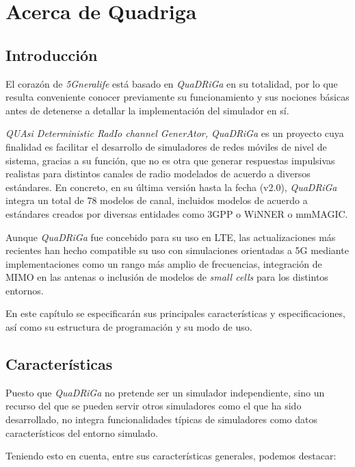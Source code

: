 \chapter{Acerca de Quadriga}\label{cap.quadriga}
\section{Introducción}
El corazón de \textit{5Gneralife} está basado en \textit{QuaDRiGa} en su totalidad, por lo que resulta conveniente conocer previamente su funcionamiento y sus nociones básicas antes de detenerse a detallar la implementación del simulador en sí.

\textit{QUAsi Deterministic RadIo channel GenerAtor, QuaDRiGa} es un proyecto cuya finalidad es facilitar el desarrollo de simuladores de redes móviles de nivel de sistema, gracias a su función, que no es otra que generar respuestas impulsivas realistas para distintos canales de radio modelados de acuerdo a diversos estándares. En concreto, en su última versión hasta la fecha (v2.0), \textit{QuaDRiGa} integra un total de 78 modelos de canal, incluidos modelos de acuerdo a estándares creados por diversas entidades como 3GPP o WiNNER \cite{winner} o mmMAGIC.

Aunque \textit{QuaDRiGa} fue concebido para su uso en LTE, las actualizaciones más recientes han hecho compatible su uso con simulaciones orientadas a 5G mediante implementaciones como un rango más amplio de frecuencias, integración de MIMO en las antenas o inclusión de modelos de \textit{small cells} para los distintos entornos.

En este capítulo se especificarán sus principales características y especificaciones, así como su estructura de programación y su modo de uso.

\section{Características}

Puesto que \textit{QuaDRiGa} no pretende ser un simulador independiente, sino un recurso del que se pueden servir otros simuladores como el que ha sido desarrollado, no integra funcionalidades típicas de simuladores como datos característicos del entorno simulado.

Teniendo esto en cuenta, entre sus características generales, podemos destacar:

